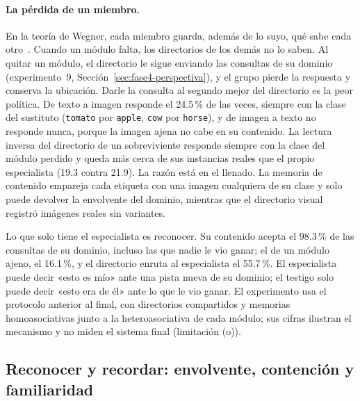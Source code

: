 \paragraph{La pérdida de un miembro.}
En la teoría de Wegner, cada miembro guarda, además de lo suyo, qué sabe cada
otro~\cite{wegner1987transactive}.
Cuando un módulo falta, los directorios de los demás no lo saben.
Al quitar un módulo, el directorio le sigue enviando las consultas de su dominio
(experimento~9, Sección~\ref{sec:fase4-perspectiva}), y el grupo pierde la respuesta y
conserva la ubicación.
Darle la consulta al segundo mejor del directorio es la peor política.
De texto a imagen responde el 24.5\,\% de las veces, siempre con la clase del sustituto
(\texttt{tomato} por \texttt{apple}, \texttt{cow} por \texttt{horse}), y de imagen a
texto no responde nunca, porque la imagen ajena no cabe en su contenido.
La lectura inversa del directorio de un sobreviviente responde siempre con la clase del
módulo perdido y queda más cerca de sus instancias reales que el propio especialista
(19.3 contra 21.9).
La razón está en el llenado.
La memoria de contenido empareja cada etiqueta con una imagen cualquiera de su clase y
solo puede devolver la envolvente del dominio, mientras que el directorio visual
registró imágenes reales sin variantes.

Lo que solo tiene el especialista es reconocer.
Su contenido acepta el 98.3\,\% de las consultas de su dominio, incluso las que nadie le
vio ganar; el de un módulo ajeno, el 16.1\,\%, y el directorio enruta al especialista el
55.7\,\%.
El especialista puede decir «esto es mío» ante una pista nueva de su dominio; el testigo
solo puede decir «esto era de él» ante lo que le vio ganar.
El experimento usa el protocolo anterior al final, con directorios compartidos y
memorias homoasociativas junto a la heteroasociativa de cada módulo; sus cifras
ilustran el mecanismo y no miden el sistema final (limitación (o)).

\subsection{Reconocer y recordar: envolvente, contención y familiaridad}
\label{fase:disc-reconocer}
\label{sec:disc-una-memoria}

